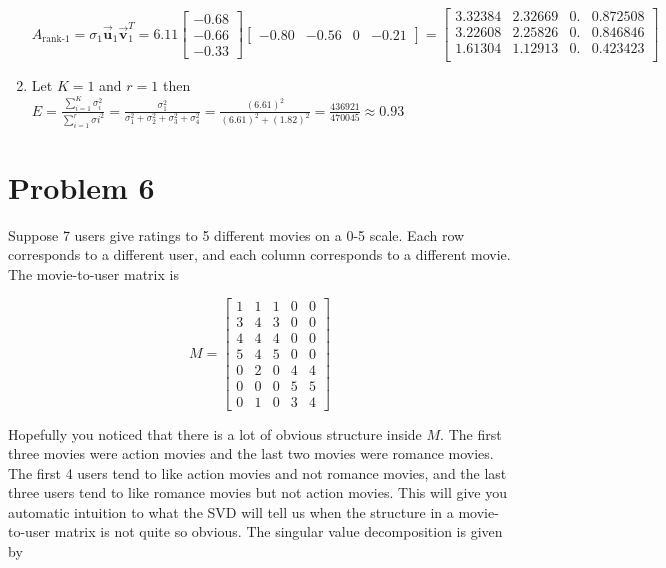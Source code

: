 \documentclass[letter,11pt]{article}
\theoremstyle{definition}
\newcommand{\vvec}{\vec{\boldsymbol{v}}}
\newcommand{\uvec}{\vec{\boldsymbol{u}}}
\begin{document}
\begin{tcolorbox}[boxrule=1mm,enhanced jigsaw, breakable,before=\hfill,after=\hfill,adjusted title={Problem 5 solutions}]
\begin{enumerate}[label = \alph*.)]
    $$A_{\text{rank-1}} = \sigma_{1} \uvec_{1}\vvec^{T}_{1} = 6.11 \begin{bmatrix}-0.68\\ -0.66\\-0.33\end{bmatrix}\begin{bmatrix}-0.80 & -0.56 & 0 & -0.21\end{bmatrix} = \begin{bmatrix}
 3.32384 & 2.32669 & 0. & 0.872508 \\
 3.22608 & 2.25826 & 0. & 0.846846 \\
 1.61304 & 1.12913 & 0. & 0.423423 \\
\end{bmatrix}$$
\item Let $K=1$ and $r=1$ then $E = \frac{\sum_{i=1}^{K} \sigma_{i}^{2}}{\sum_{i=1}^{r} \sigma{i}^{2}} = \frac{\sigma_{1}^{2}}{\sigma_{1}^2 + \sigma_{2}^2 + \sigma_{3}^2+\sigma_{4}^2} = \frac{(6.61)^2}{(6.61)^2+ (1.82)^2} = \frac{436921}{470045} \approx 0.93$
    \end{enumerate}
\end{tcolorbox}

\newpage
\section{Problem 6}
Suppose 7 users give ratings to 5 different movies on a 0-5 scale. Each row corresponds to a different user, and each column corresponds to a different movie. The movie-to-user matrix is

$$
M=\begin{bmatrix}
1 & 1 & 1 & 0 & 0 \\
3 & 4 & 3 & 0 & 0 \\
4 & 4 & 4 & 0 & 0 \\
5 & 4 & 5 & 0 & 0 \\
0 & 2 & 0 & 4 & 4 \\
0 & 0 & 0 & 5 & 5 \\
0 & 1 & 0 & 3 & 4
\end{bmatrix}
$$

Hopefully you noticed that there is a lot of obvious structure inside $M$. The first three movies were action movies and the last two movies were romance movies. The first 4 users tend to like action movies and not romance movies, and the last three users tend to like romance movies but not action movies. This will give you automatic intuition to what the SVD will tell us when the structure in a movie-to-user matrix is not quite so obvious. The singular value decomposition is given by 
\end{document}
